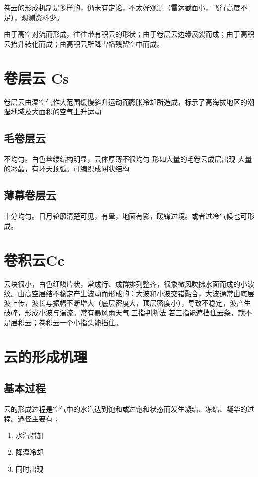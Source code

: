 \documentclass[UTF8,11pt]{ctexbook}
\begin{document}
卷云的形成机制是多样的，仍未有定论，不太好观测（雷达截面小，飞行高度不足），观测资料少。

由于高空对流而形成，往往带有积云的形状；由于卷层云边缘展裂而成；由于高积云抬升转化而成；由高积云所降雪幡残留空中而成。


\section{卷层云 Cs}

卷层云由湿空气作大范围缓慢斜升运动而膨胀冷却所造成，标示了高海拔地区的潮湿地域及大面积的空气上升运动

\subsection{毛卷层云}

不均匀。白色丝缕结构明显，云体厚薄不很均匀 形如大量的毛卷云成层出现 大量的冰晶，有环天顶弧。可编织成网状结构

\subsection{薄幕卷层云}

十分均匀。日月轮廓清楚可见，有晕，地面有影，暖锋过境。或者过冷气候也可形成。

\section{卷积云Cc}

云块很小，白色细鳞片状，常成行、成群排列整齐，很象微风吹拂水面而成的小波纹。由高空层结不稳定产生波动而形成的：大波和小波交错融合，大波通常由底层波上传，波长与振幅不断增大（底层密度大，顶层密度小），导致不稳定，波产生破碎，形成小波与湍流。常有暴风雨天气
三指判断法	若三指能遮挡住云条，就不是层积云；卷积云一个小指头能挡住。

\section{云的形成机理}

\subsection{基本过程}

云的形成过程是空气中的水汽达到饱和或过饱和状态而发生凝结、冻结、凝华的过程。途径主要有：
\begin{enumerate}
    \item 水汽增加
    \item 降温冷却
    \item 同时出现
\end{enumerate}
\end{document}
